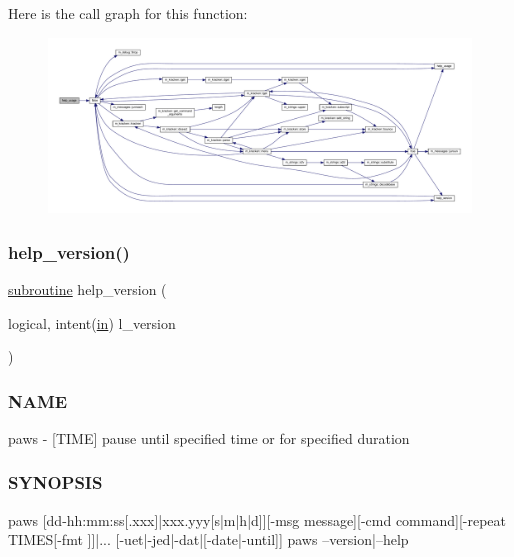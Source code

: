 Here is the call graph for this function\+:
\nopagebreak
\begin{figure}[H]
\begin{center}
\leavevmode
\includegraphics[width=350pt]{paws_8f90_a3e09a3b52ee8fb04eeb93fe5761626a8_cgraph}
\end{center}
\end{figure}
\mbox{\label{paws_8f90_a39c21619b08a3c22f19e2306efd7f766}} 
\subsubsection{\texorpdfstring{help\+\_\+version()}{help\_version()}}
{\footnotesize\ttfamily \hyperlink{M__stopwatch_83_8txt_acfbcff50169d691ff02d4a123ed70482}{subroutine} help\+\_\+version (\begin{DoxyParamCaption}\item[{logical, intent(\hyperlink{M__journal_83_8txt_afce72651d1eed785a2132bee863b2f38}{in})}]{l\+\_\+version }\end{DoxyParamCaption})}



\subsubsection*{N\+A\+ME}

paws -\/ \mbox{[}T\+I\+ME\mbox{]} pause until specified time or for specified duration 

\subsubsection*{S\+Y\+N\+O\+P\+S\+IS}

\begin{DoxyVerb}paws [dd-hh:mm:ss[.xxx]|xxx.yyy[s|m|h|d]][-msg message][-cmd command][-repeat TIMES[-fmt ]]|...
[-uet|-jed|-dat|[-date|-until]]
paws --version|--help
\end{DoxyVerb}


